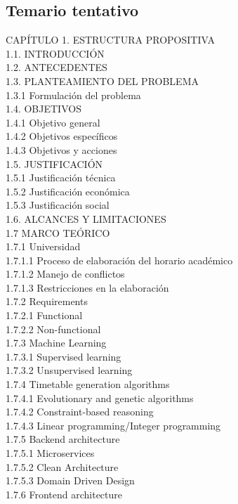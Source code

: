 \subsection{Temario tentativo}

CAPÍTULO 1. ESTRUCTURA PROPOSITIVA \\
1.1. INTRODUCCIÓN \\
1.2. ANTECEDENTES \\
1.3. PLANTEAMIENTO DEL PROBLEMA \\
1.3.1 Formulación del problema \\
1.4. OBJETIVOS \\
1.4.1 Objetivo general\\
1.4.2 Objetivos específicos \\
1.4.3 Objetivos y acciones \\
1.5. JUSTIFICACIÓN \\
1.5.1 Justificación técnica \\
1.5.2 Justificación económica \\
1.5.3 Justificación social \\
1.6. ALCANCES Y LIMITACIONES \\
1.7 MARCO TEÓRICO\\
1.7.1 Universidad\\
1.7.1.1 Proceso de elaboración del horario académico\\
1.7.1.2 Manejo de conflictos\\
1.7.1.3 Restricciones en la elaboración\\
1.7.2 Requirements\\
1.7.2.1 Functional\\
1.7.2.2 Non-functional\\
1.7.3 Machine Learning\\
1.7.3.1 Supervised learning\\
1.7.3.2 Unsupervised learning\\
1.7.4 Timetable generation algorithms\\
1.7.4.1 Evolutionary and genetic algorithms\\
1.7.4.2 Constraint-based reasoning\\
1.7.4.3 Linear programming/Integer programming\\
1.7.5 Backend architecture\\
1.7.5.1 Microservices\\
1.7.5.2 Clean Architecture\\
1.7.5.3 Domain Driven Design\\
1.7.6 Frontend architecture\\

